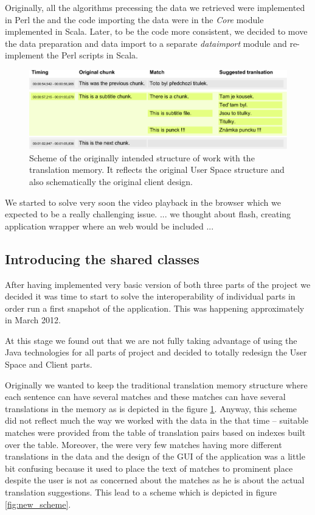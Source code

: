 Originally, all the algorithms precessing the data we retrieved were implemented in Perl the and the code importing the data were in the \emph{Core} module implemented in Scala. Later, to be the code more consistent, we decided to move the data preparation and data import to a separate \emph{dataimport} module and re-implement the Perl scripts in Scala.

\begin{figure}[h]
\begin{center}
\includegraphics{./figures/original_strucutre.pdf}
\end{center}

\caption{Scheme of the originally intended structure of work with the translation memory. It reflects the original User Space structure and also schematically the original client design.}\label{fig:original_scheme}

\end{figure}

We started to solve very soon the video playback in the browser which we expected to be a really challenging issue. ... we thought about flash, creating application wrapper where an web would be included ...

\subsection{Introducing the shared classes}

After having implemented very basic version of both three parts of the project we decided it was time to start to solve the interoperability of individual parts in order run a first snapshot of the application. This was happening approximately in March 2012.

At this stage we found out that we are not fully taking advantage of using the Java technologies for all parts of project and decided to totally redesign the User Space and Client parts.

Originally we wanted to keep the traditional translation memory structure where each sentence can have several matches and these matches can have several translations in the memory as is depicted in the figure \ref{fig:original_scheme}. Anyway, this scheme did not reflect much the way we worked with the data in the that time -- suitable matches were provided from the table of translation pairs based on indexes built over the table. Moreover, the were very few matches having more different translations in the data and the design of the GUI of the application was a little bit confusing because it used to place the text of matches to prominent place despite the user is not as concerned about the matches as he is about the actual translation suggestions. This lead to a scheme which is depicted in figure \ref{fig:new_scheme}.

